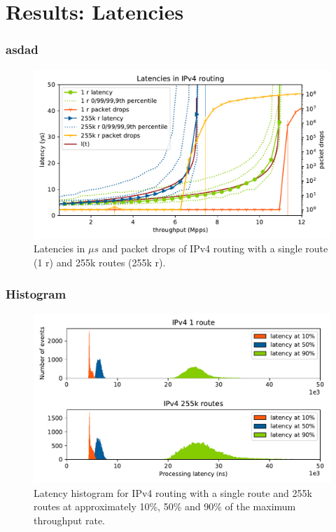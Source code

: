 \section{Results: Latencies}

\begin{frame}
    \frametitle{asdad}
    \begin{figure}[!ht]
    \noindent\hspace{0.5mm}\includegraphics[width=\linewidth]{pics/latencies_per_throughput_summary_ip4.pdf}
    \caption{Latencies in $\mu s$ and packet drops of IPv4 routing with a single route (1 r) and 255k routes (255k r). }
    \label{graph:latencyoverview}
    \end{figure}
\end{frame}

\begin{frame}
    \frametitle{Histogram}
    \begin{figure}[!ht]
    \noindent\hspace{0.5mm}\includegraphics[width=\linewidth]{pics/latency_histogram_overview_ip4.pdf}
    \caption{Latency histogram for IPv4 routing with a single route and 255k routes at approximately 10\%, 50\% and 90\% of the maximum throughput rate. }
    \label{graph:latencyhistogram}
    \end{figure}
\end{frame}

